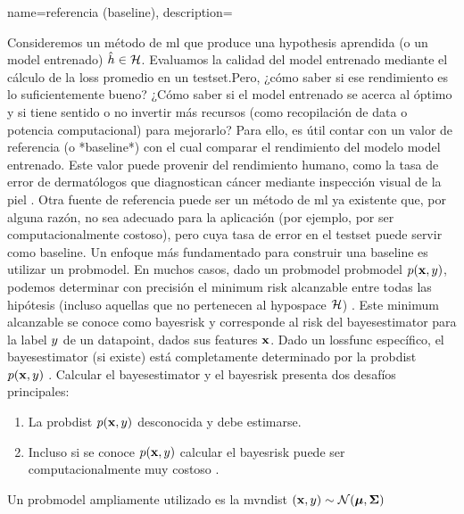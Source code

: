 {name={referencia (baseline)},
    description={Consideremos un método de \gls{ml} que produce una 
    \gls{hypothesis} aprendida (o un \gls{model} entrenado) $\hat{h} \in \mathcal{H}$.
	Evaluamos la calidad del \gls{model} entrenado  
	mediante el cálculo de la \gls{loss} promedio en un \gls{testset}.Pero, ¿cómo saber si ese rendimiento es lo suficientemente bueno?
	¿Cómo saber si el \gls{model} entrenado se acerca al óptimo y si tiene sentido o no invertir más recursos (como recopilación de \gls{data} o potencia computacional) para mejorarlo? 
    Para ello, es útil contar con un valor de referencia (o *baseline*) con el cual comparar el rendimiento  
    del modelo \gls{model} entrenado. Este valor puede provenir del rendimiento humano,
    como la tasa de error de dermatólogos que diagnostican cáncer mediante inspección visual de la piel \cite{SkinHumanAI}.
	Otra fuente de referencia puede ser un método de \gls{ml} ya existente que, por alguna razón, no sea adecuado para la aplicación (por ejemplo, por ser computacionalmente costoso), pero cuya tasa de error en el \gls{testset} puede servir como baseline.
	Un enfoque más fundamentado para construir una baseline es utilizar un \gls{probmodel}. En muchos casos, dado un \gls{probmodel} \gls{probmodel} $p({\bf x},y)$,  
    podemos determinar con precisión el \gls{minimum} \gls{risk} alcanzable entre todas las hipótesis (incluso aquellas que no pertenecen al \gls{hypospace} $\mathcal{H}$) \cite{LC}. 
    Este \gls{minimum} alcanzable se conoce como \gls{bayesrisk} y corresponde al \gls{risk} del \gls{bayesestimator} para la \gls{label} $y$ de un \gls{datapoint}, dados sus \gls{feature}s ${\bf x}$.
	Dado un \gls{lossfunc} específico, el \gls{bayesestimator} (si existe) está completamente determinado por la \gls{probdist} $p({\bf x},y)$ \cite[Cap. 4]{LC}. 
    Calcular el \gls{bayesestimator} y el \gls{bayesrisk} presenta dos desafíos principales:
    \begin{enumerate}[label=\arabic*)]
    	\item La \gls{probdist} $p({\bf x},y)$ desconocida y debe estimarse.
    	\item Incluso si se conoce $p({\bf x},y)$ calcular el 
		\gls{bayesrisk} puede ser computacionalmente muy costoso \cite{cooper1990computational}.
	\end{enumerate}
	Un \gls{probmodel} ampliamente utilizado es la \gls{mvndist} $\left( {\bf x},y \right) \sim \mathcal{N}({\bm \mu},{\bm \Sigma})$ 
}}
